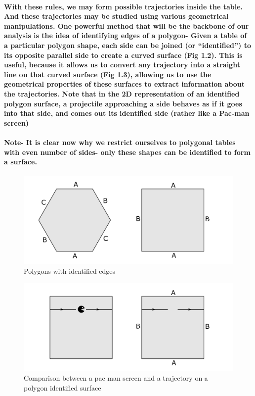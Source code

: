 \documentclass{report}
\begin{document}
\paragraph{With these rules, we may form possible trajectories inside the table. And these trajectories may be studied using various geometrical manipulations. One powerful method that will be the backbone of our analysis is the idea of identifying edges of a polygon- Given a table of a particular polygon shape, each side can be joined (or “identified”) to its opposite parallel side to create a curved surface (Fig 1.2). This is useful, because it allows us to convert any trajectory into a straight line on that curved surface (Fig 1.3), allowing us to use the geometrical properties of these surfaces to extract information about the trajectories. Note that in the 2D representation of an identified polygon surface, a projectile approaching a side behaves as if it goes into that side, and comes out its identified side (rather like a Pac-man screen)}

\paragraph{Note- It is clear now why we restrict ourselves to polygonal tables with even number of sides- only these shapes can be identified to form a surface.}

\begin{center}
\begin{figure} 
\includegraphics[scale=0.3]{2}
\caption{Polygons with identified edges}
\end{figure}
\end{center}

\begin{center}
\begin{figure} 
\includegraphics[scale=0.3]{3}
\caption{Comparison between a pac man screen and a trajectory on a polygon identified surface}
\end{figure}
\end{center}
\end{document}
